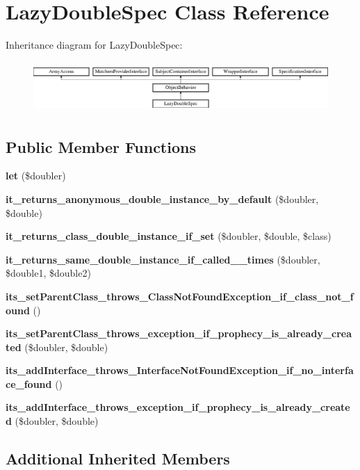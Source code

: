 \section{Lazy\+Double\+Spec Class Reference}
\label{classspec_1_1_prophecy_1_1_doubler_1_1_lazy_double_spec}
Inheritance diagram for Lazy\+Double\+Spec\+:\begin{figure}[H]
\begin{center}
\leavevmode
\includegraphics[height=1.953488cm]{classspec_1_1_prophecy_1_1_doubler_1_1_lazy_double_spec}
\end{center}
\end{figure}
\subsection*{Public Member Functions}
\begin{DoxyCompactItemize}
\item 
{\bf let} (\$doubler)
\item 
{\bf it\+\_\+returns\+\_\+anonymous\+\_\+double\+\_\+instance\+\_\+by\+\_\+default} (\$doubler, \$double)
\item 
{\bf it\+\_\+returns\+\_\+class\+\_\+double\+\_\+instance\+\_\+if\+\_\+set} (\$doubler, \$double, \$class)
\item 
{\bf it\+\_\+returns\+\_\+same\+\_\+double\+\_\+instance\+\_\+if\+\_\+called\+\_\+\_\+times} (\$doubler, \$double1, \$double2)
\item 
{\bf its\+\_\+set\+Parent\+Class\+\_\+throws\+\_\+\+Class\+Not\+Found\+Exception\+\_\+if\+\_\+class\+\_\+not\+\_\+found} ()
\item 
{\bf its\+\_\+set\+Parent\+Class\+\_\+throws\+\_\+exception\+\_\+if\+\_\+prophecy\+\_\+is\+\_\+already\+\_\+created} (\$doubler, \$double)
\item 
{\bf its\+\_\+add\+Interface\+\_\+throws\+\_\+\+Interface\+Not\+Found\+Exception\+\_\+if\+\_\+no\+\_\+interface\+\_\+found} ()
\item 
{\bf its\+\_\+add\+Interface\+\_\+throws\+\_\+exception\+\_\+if\+\_\+prophecy\+\_\+is\+\_\+already\+\_\+created} (\$doubler, \$double)
\end{DoxyCompactItemize}
\subsection*{Additional Inherited Members}


